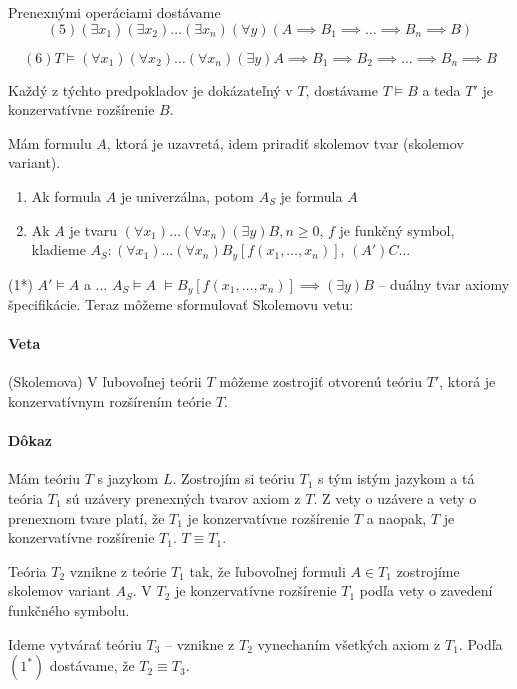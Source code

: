 \par Prenexnými operáciami dostávame  $$(5) (\exists x_1) (\exists x_2) \ldots
(\exists x_n) (\forall y) (A \implies B_1 \implies \ldots \implies B_n \implies
B)$$

$$(6) T \models (\forall x_1 ) (\forall x_2) \ldots (\forall x_n) (\exists y)
A \implies B_1 \implies B_2 \implies \ldots \implies B_n \implies B$$

\par Každý z týchto predpokladov je dokázateľný v $T$, dostávame $T \models B$ a
teda $T'$ je konzervatívne rozšírenie $B$.

Mám formulu $A$, ktorá je uzavretá, idem priradiť skolemov tvar (skolemov
variant).
\begin{enumerate}
	\item Ak formula $A$ je univerzálna, potom $A_S$ je formula $A$
	\item Ak $A$ je tvaru $(\forall x_1) \ldots (\forall x_n) (\exists y) B,
	n\geq 0$, $f$ je funkčný symbol, kladieme $A_S: (\forall x_1) \ldots
	(\forall x_n) B_y[f(x_1,\ldots, x_n)]$, $(A')C ...$
\end{enumerate}

(1*) $A' \models A$ a ... $A_S \models A$
$ \models B_y[f(x_1, \ldots, x_n)] \implies (\exists y) B$ -- duálny tvar
axiomy špecifikácie. Teraz môžeme sformulovať Skolemovu vetu:

\paragraph{Veta} (Skolemova) V ľubovoľnej teórii $T$ môžeme zostrojiť otvorenú
teóriu $T'$, ktorá je konzervatívnym rozšírením teórie $T$.
\paragraph{Dôkaz} Mám teóriu $T$ s jazykom $L$. Zostrojím si teóriu $T_1$ s tým
istým jazykom a tá teória $T_1$ sú uzávery prenexných tvarov axiom z $T$. Z vety
o uzávere a vety o prenexnom tvare platí, že $T_1$ je konzervatívne rozšírenie
$T$ a naopak, $T$ je konzervatívne rozšírenie $T_1$. $T \equiv T_1$.

\par Teória $T_2$ vznikne z teórie $T_1$ tak, že ľubovoľnej formuli $A \in T_1$
zostrojíme skolemov variant $A_S$. V $T_2$ je konzervatívne rozšírenie $T_1$
podľa vety o zavedení funkčného symbolu. 

\par Ideme vytvárať teóriu $T_3$ -- vznikne z $T_2$ vynechaním všetkých axiom z
$T_1$. Podľa $(1^*)$ dostávame, že $T_2 \equiv T_3$.

